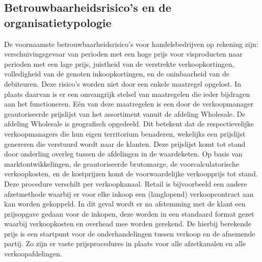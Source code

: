 \newpage

\subsection{Betrouwbaarheidsrisico's en de organisatietypologie}
De voornaamste betrouwbaarheidsrisico's voor handelsbedrijven op rekening zijn: verschuivingsgevaar van perioden met een hoge prijs voor visproducten naar perioden met een lage prijs, juistheid van de verstrekte verkoopkortingen, volledigheid van de genoten inkoopkortingen, en de oninbaarheid van de debiteuren. Deze risico's worden niet door een enkele maatregel opgelost. In plaats daarvan is er een omvangrijk stelsel van maatregelen die ieder bijdragen aan het functioneren. Eén van deze maatregelen is een door de verkoopmanager geautoriseerde prijslijst van het assortiment vanuit de afdeling Wholesale. De afdeling Wholesale is geografisch opgedeeld. Dit betekent dat de respectievelijke verkoopmanagers die hun eigen territorium benaderen, wekelijks een prijslijst genereren die verstuurd wordt naar de klanten. Deze prijslijst komt tot stand door onderling overleg tussen de afdelingen in de waardeketen. Op basis van marktontwikkelingen, de geautoriseerde brutomarge, de voorcalculatorische verkoopkosten, en de kostprijzen komt de voorwaardelijke verkoopprijs tot stand. Deze procedure verschilt per verkoopkanaal. Retail is bijvoorbeeld een andere afzetmethode waarbij er voor elke inkoop een (langlopend) verkoopcontract aan kan worden gekoppeld. In dit geval wordt er na afstemming met de klant een prijsopgave gedaan voor de inkopen, deze worden in een standaard format gezet waarbij verkoopkosten en overhead mee worden gerekend. De hierbij berekende prijs is een startpunt voor de onderhandelingen tussen verkoop en de afnemende partij. Zo zijn er vaste prijsprocedures in plaats voor alle afzetkanalen en alle verkoopafdelingen. \citep{aoibsfc}

